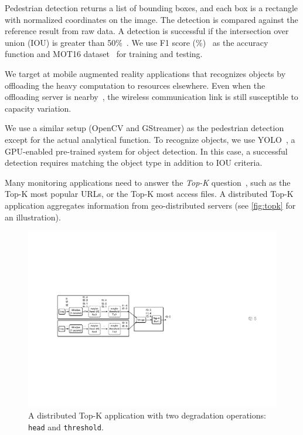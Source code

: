 Pedestrian detection returns a list of bounding boxes, and each box is a
rectangle with normalized coordinates on the image. The detection is compared
against the reference result from raw data. A detection is successful if the
intersection over union (IOU) is greater than
50\%~\cite{everingham2010pascal}. We use F1 score
(\%)~\cite{Rijsbergen:1979:IR:539927} as the accuracy function and MOT16
dataset~\cite{milan2016mot16} for training and testing.

 We target at mobile augmented reality applications
that recognizes objects by offloading the heavy computation to resources
elsewhere. Even when the offloading server is
nearby~\cite{satyanarayanan2009case, zhang2015cloud}, the wireless communication
link is still susceptible to capacity variation.

We use a similar setup (OpenCV and GStreamer) as the pedestrian detection except
for the actual analytical function. To recognize objects, we use
YOLO~\cite{darknet13, redmon2016yolo9000}, a GPU-enabled pre-trained system for
object detection. In this case, a successful detection requires matching the
object type in addition to IOU criteria.

 Many monitoring applications need to answer the
\textit{Top-K} question~\cite{babcock2003distributed}, such as the Top-K most
popular URLs, or the Top-K most access files. A distributed Top-K application
aggregates information from geo-distributed servers (see \autoref{fig:topk} for
an illustration).

\begin{figure}
  \centering
  \includegraphics[width=\columnwidth]{figures/topk.pdf}
  \caption{A distributed Top-K application with two degradation operations:
    \texttt{head} and \texttt{threshold}.}
  \label{fig:topk}
\end{figure}


